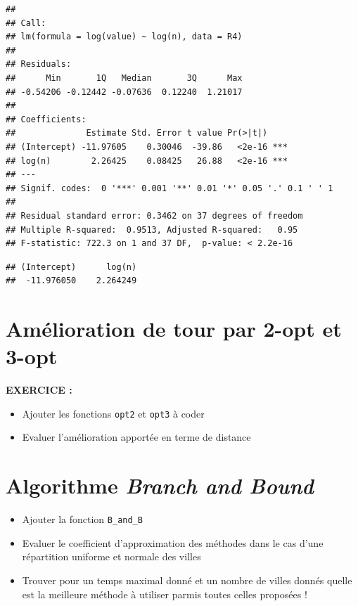 \documentclass[
]{article}
\newenvironment{Shaded}{\begin{snugshade}}{\end{snugshade}}
\newcommand{\NormalTok}[1]{#1}
\newcommand{\SpecialCharTok}[1]{\textcolor[rgb]{0.00,0.00,0.00}{#1}}
\begin{document}
\begin{verbatim}
## 
## Call:
## lm(formula = log(value) ~ log(n), data = R4)
## 
## Residuals:
##      Min       1Q   Median       3Q      Max 
## -0.54206 -0.12442 -0.07636  0.12240  1.21017 
## 
## Coefficients:
##              Estimate Std. Error t value Pr(>|t|)    
## (Intercept) -11.97605    0.30046  -39.86   <2e-16 ***
## log(n)        2.26425    0.08425   26.88   <2e-16 ***
## ---
## Signif. codes:  0 '***' 0.001 '**' 0.01 '*' 0.05 '.' 0.1 ' ' 1
## 
## Residual standard error: 0.3462 on 37 degrees of freedom
## Multiple R-squared:  0.9513, Adjusted R-squared:   0.95 
## F-statistic: 722.3 on 1 and 37 DF,  p-value: < 2.2e-16
\end{verbatim}

\begin{Shaded}
\end{Shaded}

\begin{verbatim}
## (Intercept)      log(n) 
##  -11.976050    2.264249
\end{verbatim}

\hypertarget{amuxe9lioration-de-tour-par-2-opt-et-3-opt}{%
\section{Amélioration de tour par 2-opt et
3-opt}\label{amuxe9lioration-de-tour-par-2-opt-et-3-opt}}

\textbf{EXERCICE :}

\begin{itemize}
\item
  Ajouter les fonctions \texttt{opt2} et \texttt{opt3} à coder
\item
  Evaluer l'amélioration apportée en terme de distance
\end{itemize}

\hypertarget{algorithme-branch-and-bound}{%
\section{\texorpdfstring{Algorithme \emph{Branch and
Bound}}{Algorithme Branch and Bound}}\label{algorithme-branch-and-bound}}

\begin{itemize}
\item
  Ajouter la fonction \texttt{B\_and\_B}
\item
  Evaluer le coefficient d'approximation des méthodes dans le cas d'une
  répartition uniforme et normale des villes
\item
  Trouver pour un temps maximal donné et un nombre de villes donnés
  quelle est la meilleure méthode à utiliser parmis toutes celles
  proposées !
\end{itemize}
\end{document}
